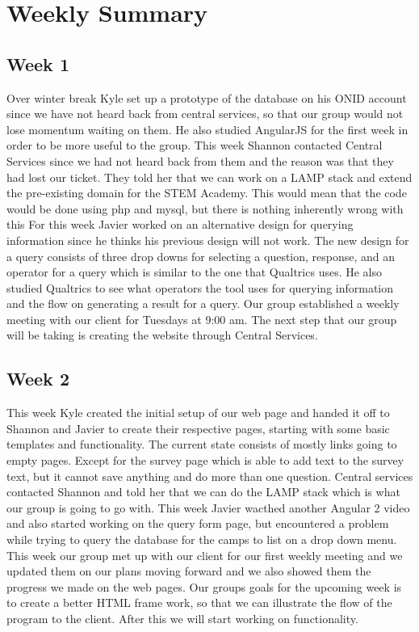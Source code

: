 \documentclass[letterpaper,10pt,serif, draftclsnofoot,onecolumn, compsoc, titlepage]{IEEEtran}
\begin{document}
\section{Weekly Summary}
\subsection{Week 1}
Over winter break Kyle set up a prototype of the database on his ONID account since we have not heard back from central services, so that our group would not lose momentum waiting on them.
He also studied AngularJS for the first week in order to be more useful to the group.
This week Shannon contacted Central Services since we had not heard back from them and the reason was that they had lost our ticket.
They told her that we can work on a LAMP stack and extend the pre-existing domain for the STEM Academy.
This would mean that the code would be done using php and mysql, but there is nothing inherently wrong with this
 For this week Javier worked on an alternative design for querying information since he thinks his previous design will not work.
The new design for a query consists of three drop downs for selecting a question, response, and an operator for a query which is similar to the one that Qualtrics uses.
He also studied Qualtrics to see what operators the tool uses for querying information and the flow on generating a result for a query.
Our group established a weekly meeting with our client for Tuesdays at 9:00 am.
The next step that our group will be taking is creating the website through Central Services. 

\subsection{Week 2}
This week Kyle created the initial setup of our web page and handed it off to Shannon and Javier to create their respective pages, starting with some basic templates and functionality.
The current state consists of mostly links going to empty pages.
Except for the survey page which is able to add text to the survey text, but it cannot save anything and do more than one question.
Central services contacted Shannon and told her that we can do the LAMP stack which is what our group is going to go with.
This week Javier wacthed another Angular 2 video and also started working on the query form page, but encountered a problem while trying to query the database for the camps to list on a drop down menu.
This week our group met up with our client for our first weekly meeting and we updated them on our plans moving forward and we also showed them the progress we made on the web pages.
Our groups goals for the upcoming week is to create a better HTML frame work, so that we can illustrate the flow of the program to the client. After this we will start working on functionality. 
\end{document}
